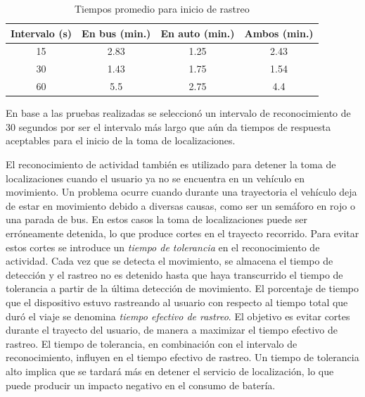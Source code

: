 \begin{table}[h]
  \centering
	\begin{tabular}{cccc}
	\toprule
	Intervalo (s) & En bus (min.) & En auto (min.) & Ambos (min.) \\
	\midrule
	15            & 2.83         & 1.25          & 2.43           \\
	30            & 1.43         & 1.75          & 1.54           \\
	60            & 5.5          & 2.75          & 4.4            \\
	\bottomrule
	\end{tabular}
  \caption{Tiempos promedio para inicio de rastreo}
  \label{tab:prom_intervalo_reconocimiento}
\end{table}

En base a las pruebas realizadas se seleccionó un intervalo de reconocimiento de 30 segundos por ser el intervalo más largo que aún da tiempos de respuesta aceptables para el inicio de la toma de localizaciones.

El reconocimiento de actividad también es utilizado para detener la toma de localizaciones cuando el usuario ya no se encuentra en un vehículo en movimiento. Un problema ocurre cuando durante una trayectoria el vehículo deja de estar en movimiento debido a diversas causas, como ser un semáforo en rojo o una parada de bus. En estos casos la toma de localizaciones puede ser erróneamente detenida, lo que produce cortes en el trayecto recorrido. Para evitar estos cortes se introduce un \emph{tiempo de tolerancia} en el reconocimiento de actividad. Cada vez que se detecta el movimiento, se almacena el tiempo de detección y el rastreo no es detenido hasta que haya transcurrido el tiempo de tolerancia a partir de la última detección de movimiento. El porcentaje de tiempo que el dispositivo estuvo rastreando al usuario con respecto al tiempo total que duró el viaje se denomina \emph{tiempo efectivo de rastreo}. El objetivo es evitar cortes durante el trayecto del usuario, de manera a maximizar el tiempo efectivo de rastreo. El tiempo de tolerancia, en combinación con el intervalo de reconocimiento, influyen en el tiempo efectivo de rastreo. Un tiempo de tolerancia alto implica que se tardará más en detener el servicio de localización, lo que puede producir un impacto negativo en el consumo de batería.

